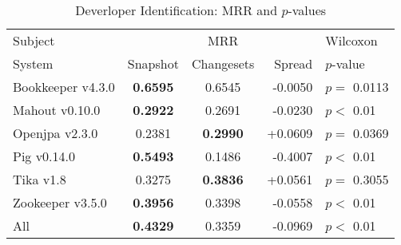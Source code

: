 \begin{table}[t]
\centering
\caption{Deverloper Identification: MRR and $p$-values}
\begin{tabular}{l|ccr|l}
\toprule
Subject & & MRR & & Wilcoxon  \\
System  &  Snapshot & Changesets & Spread & $p$-value  \\
\midrule
Bookkeeper v4.3.0 & {\bf 0.6595 } & 0.6545 & -0.0050 & $p = $ 0.0113 \\
Mahout v0.10.0 & {\bf 0.2922 } & 0.2691 & -0.0230 & $p < $ 0.01 \\
Openjpa v2.3.0 & 0.2381 & {\bf 0.2990 } & +0.0609 & $p = $ 0.0369 \\
Pig v0.14.0 & {\bf 0.5493 } & 0.1486 & -0.4007 & $p < $ 0.01 \\
Tika v1.8 & 0.3275 & {\bf 0.3836 } & +0.0561 & $p = $ 0.3055 \\
Zookeeper v3.5.0 & {\bf 0.3956 } & 0.3398 & -0.0558 & $p < $ 0.01 \\
\midrule
All & {\bf 0.4329 } & 0.3359 & -0.0969 & $p < $ 0.01 \\
\bottomrule
\end{tabular}
\label{table:triage_rq1}
\end{table}

